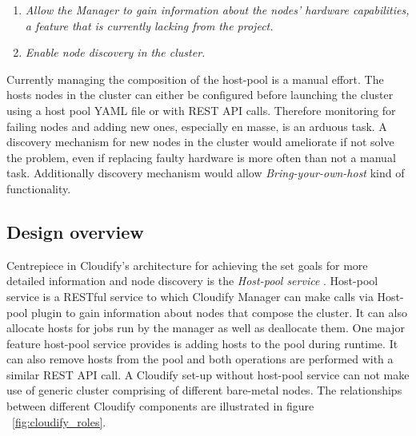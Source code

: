 \begin{enumerate}
\item \textit{Allow the Manager to gain information about the nodes' hardware capabilities, a feature that is currently lacking from the project.}
\item \textit{Enable node discovery in the cluster.}
\end{enumerate}

Currently managing the composition of the host-pool is a manual effort. The hosts nodes in the cluster can either be configured before launching the cluster using a host pool YAML file or with REST API calls. Therefore monitoring for failing nodes and adding new ones, especially en masse, is an arduous task. A discovery mechanism for new nodes in the cluster would ameliorate if not solve the problem, even if replacing faulty hardware is more often than not a manual task. Additionally discovery mechanism would allow \textit{Bring-your-own-host} kind of functionality.

 \subsection{Design overview}
 
Centrepiece in Cloudify's architecture for achieving the set goals for more detailed information and node discovery is the \textit{Host-pool service} \cite{host-pool-service}. Host-pool service is a RESTful service to which Cloudify Manager can make calls via Host-pool plugin to gain information about nodes that compose the cluster. It can also allocate hosts for jobs run by the manager as well as deallocate them. One major feature host-pool service provides is adding hosts to the pool during runtime. It can also remove hosts from the pool and both operations are performed with a similar REST API call. A Cloudify set-up without host-pool service can not make use of generic cluster comprising of different bare-metal nodes. The relationships between different Cloudify components are illustrated in figure ~\ref{fig:cloudify_roles}.
 
